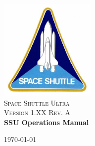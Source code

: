 \documentclass[13pt, letter,final]{article}
\begin{document}
\begin{titlepage}

\begin{center}

\includegraphics[width=0.35\textwidth]{SSP.jpg}\\[1cm]    

\textsc{\LARGE Space Shuttle Ultra}\\[1.5cm]

\textsc{\Large Version 1.XX  Rev. A}\\[0.5cm]

\huge \bfseries SSU Operations Manual\\[0.4cm]

\vfill

{\large \today}

\end{center}

\end{titlepage}
\end{document}
